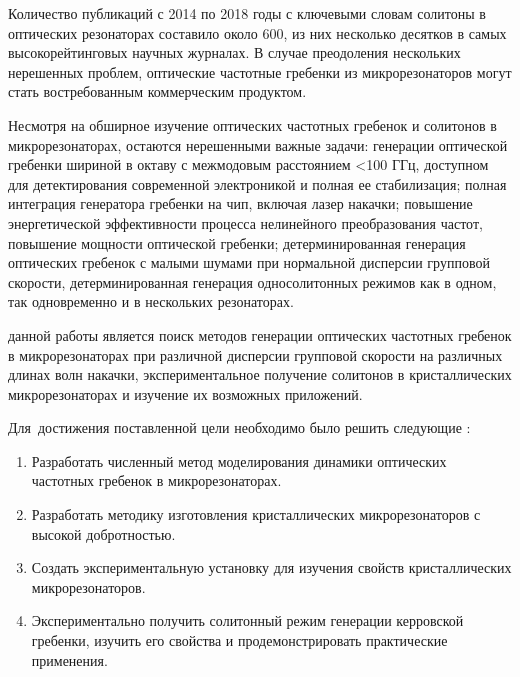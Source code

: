 Количество публикаций с 2014 по 2018 годы с ключевыми словам солитоны в оптических резонаторах составило около 600, из них несколько десятков в самых высокорейтинговых научных журналах. В случае преодоления нескольких нерешенных проблем, оптические частотные гребенки из микрорезонаторов могут стать востребованным коммерческим продуктом.

Несмотря на обширное изучение оптических частотных гребенок и солитонов в микрорезонаторах, остаются нерешенными важные задачи: генерации оптической гребенки шириной в октаву с межмодовым расстоянием <100 ГГц, доступном для детектирования современной электроникой и полная ее стабилизация; полная интеграция генератора гребенки на чип, включая лазер накачки; повышение энергетической эффективности процесса нелинейного преобразования частот, повышение мощности оптической гребенки; детерминированная генерация оптических гребенок с малыми шумами при нормальной дисперсии групповой скорости, детерминированная генерация односолитонных режимов как в одном, так одновременно и в нескольких резонаторах.



{\aim} данной работы является поиск методов генерации оптических частотных гребенок в микрорезонаторах при различной дисперсии групповой скорости на различных длинах волн накачки, экспериментальное получение солитонов в кристаллических микрорезонаторах и изучение их возможных приложений.

Для~достижения поставленной цели необходимо было решить следующие {\tasks}:
\begin{enumerate}
  \item Разработать численный метод моделирования динамики оптических частотных гребенок в микрорезонаторах.
  \item Разработать методику изготовления кристаллических микрорезонаторов с высокой добротностью.
  \item Создать экспериментальную установку для изучения свойств кристаллических микрорезонаторов.
  \item Экспериментально получить солитонный режим генерации керровской гребенки, изучить его свойства и продемонстрировать практические применения.
\end{enumerate}


